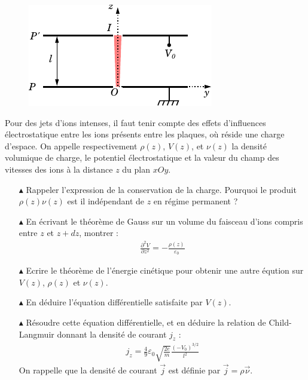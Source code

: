 \documentclass{report}
\begin{document}
\begin{figure}[h!]
\centering
		\includegraphics[scale=1.3]{em4.pdf}
\end{figure}

Pour des jets d'ions intenses, il faut tenir compte des effets d'influences électrostatique entre les ions présents entre les plaques, où réside une charge d'espace. On appelle respectivement $\rho(z)$, $V(z)$, et $\nu(z)$ la densité volumique de charge, le potentiel électrostatique et la valeur du champ des vitesses des ions à la distance $z$ du plan $xOy$. 

\begin{itemize}

	\item[$\blacktriangle$] Rappeler l'expression de la conservation de la charge. Pourquoi le produit $\rho(z)\nu(z)$ est il indépendant de $z$ en régime permanent ? 
	
	\item[$\blacktriangle$] En écrivant le théorème de Gauss sur un volume du faisceau d'ions compris entre $z$ et $z+dz$, montrer :
	\begin{align*}
		\frac{\partial^2 V}{\partial z^2}=-\frac{\rho(z)}{\varepsilon_0}
	\end{align*}
	
	\item[$\blacktriangle$] Ecrire le théorème de l'énergie cinétique pour obtenir une autre éqution sur $V(z)$, $\rho(z)$ et $\nu(z)$. 
	
	\item[$\blacktriangle$] En déduire l'équation différentielle satisfaite par $V(z)$. 
	
	\item[$\blacktriangle$] Résoudre cette équation différentielle, et en déduire la relation de Child-Langmuir donnant la densité de courant $j_z$ :
	\begin{align*}
		j_z =\frac{4}{9}\varepsilon_0\sqrt{\frac{2e}{m}}\frac{(-V_0)^{3/2}}{l^2}
\end{align*}		
On rappelle que la densité de courant $\vec{j}$ est définie par $\vec{j}=\rho\vec{\nu}$.
	
\end{itemize}
\end{document}

